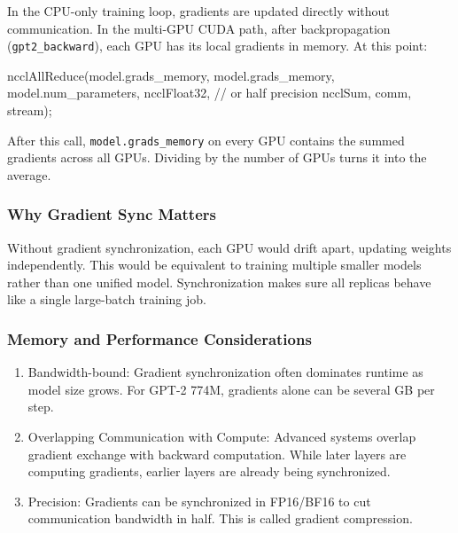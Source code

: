 \documentclass[
  letterpaper,
  DIV=11,
  numbers=noendperiod]{scrreprt}
\newenvironment{Shaded}{\begin{snugshade}}{\end{snugshade}}
\newcommand{\CommentTok}[1]{\textcolor[rgb]{0.37,0.37,0.37}{#1}}
\newcommand{\NormalTok}[1]{\textcolor[rgb]{0.00,0.23,0.31}{#1}}
\newcommand{\OperatorTok}[1]{\textcolor[rgb]{0.37,0.37,0.37}{#1}}
\providecommand{\tightlist}{%
  \setlength{\itemsep}{0pt}\setlength{\parskip}{0pt}}
\begin{document}
In the CPU-only training loop, gradients are updated directly without
communication. In the multi-GPU CUDA path, after backpropagation
(\texttt{gpt2\_backward}), each GPU has its local gradients in memory.
At this point:

\begin{Shaded}
\begin{Highlighting}[]
\NormalTok{ncclAllReduce}\OperatorTok{(}\NormalTok{model}\OperatorTok{.}\NormalTok{grads\_memory}\OperatorTok{,}
\NormalTok{              model}\OperatorTok{.}\NormalTok{grads\_memory}\OperatorTok{,}
\NormalTok{              model}\OperatorTok{.}\NormalTok{num\_parameters}\OperatorTok{,}
\NormalTok{              ncclFloat32}\OperatorTok{,}  \CommentTok{// or half precision}
\NormalTok{              ncclSum}\OperatorTok{,}
\NormalTok{              comm}\OperatorTok{,}\NormalTok{ stream}\OperatorTok{);}
\end{Highlighting}
\end{Shaded}

After this call, \texttt{model.grads\_memory} on every GPU contains the
summed gradients across all GPUs. Dividing by the number of GPUs turns
it into the average.

\subsubsection{Why Gradient Sync
Matters}\label{why-gradient-sync-matters}

Without gradient synchronization, each GPU would drift apart, updating
weights independently. This would be equivalent to training multiple
smaller models rather than one unified model. Synchronization makes sure
all replicas behave like a single large-batch training job.

\subsubsection{Memory and Performance
Considerations}\label{memory-and-performance-considerations}

\begin{enumerate}
\def\labelenumi{\arabic{enumi}.}
\tightlist
\item
  Bandwidth-bound: Gradient synchronization often dominates runtime as
  model size grows. For GPT-2 774M, gradients alone can be several GB
  per step.
\item
  Overlapping Communication with Compute: Advanced systems overlap
  gradient exchange with backward computation. While later layers are
  computing gradients, earlier layers are already being synchronized.
\item
  Precision: Gradients can be synchronized in FP16/BF16 to cut
  communication bandwidth in half. This is called gradient compression.
\end{enumerate}
\end{document}
